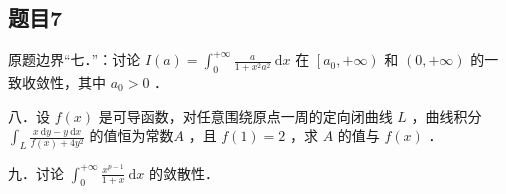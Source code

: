 \documentclass{article}
\begin{document}
\subsection{题目7}
原题边界“七．”：讨论 \(I(a)=\int_{0}^{+\infty} \frac{a}{1+x^{2} a^{2}} \mathrm{~d} x\) 在 \(\left[a_{0},+\infty\right)\) 和 \((0,+\infty)\) 的一致收敛性，其中 \(a_{0}>0\) ．

八．设 \(f(x)\) 是可导函数，对任意围绕原点一周的定向闭曲线 \(L\) ，曲线积分 \(\int_{L} \frac{x \mathrm{~d} y-y \mathrm{~d} x}{f(x)+4 y^{2}}\) 的值恒为常数\(A\) ，且 \(f(1)=2\) ，求 \(A\) 的值与 \(f(x)\) ．

九．讨论 \(\int_{0}^{+\infty} \frac{x^{p-1}}{1+x} \mathrm{~d} x\) 的敛散性．
\end{document}
